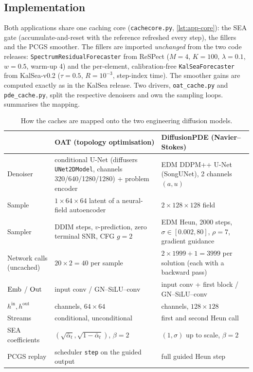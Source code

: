 \subsection{Implementation}\label{sec:app-impl}
Both applications share one caching core (\texttt{cachecore.py}, \cref{lst:app-core}): the SEA gate (accumulate-and-reset with the reference refreshed every step), the fillers and the PCGS smoother. The fillers are imported \emph{unchanged} from the two code releases: \texttt{Spectrum\-Residual\-Forecaster} from ReSPect ($M=4$, $K=100$, $\lambda=0.1$, $w=0.5$, warm-up 4) and the per-element, calibration-free \texttt{KalSea\-Forecaster} from KalSea-v0.2 ($\tau=0.5$, $R=10^{-3}$, step-index time). The smoother gains are computed exactly as in the KalSea release. Two drivers, \texttt{oat\_cache.py} and \texttt{pde\_cache.py}, split the respective denoisers and own the sampling loops.  summarises the mapping.

\begin{table}[t]
  \centering
  \small
  \caption[Mapping of the caches onto the two engineering models]{How the caches are mapped onto the two engineering diffusion models.}
  \label{tab:app-mapping}
  \begin{tabularx}{\textwidth}{@{}l>{\raggedright\arraybackslash}X>{\raggedright\arraybackslash}X@{}}
    \toprule
    & OAT (topology optimisation) & DiffusionPDE (Navier--Stokes) \\
    \midrule
    Denoiser & conditional U-Net (diffusers \texttt{UNet2DModel}, channels 320/640/1280/1280) + problem encoder & EDM DDPM++ U-Net (SongUNet), 2 channels $(a,u)$ \\
    Sample & $1\times64\times64$ latent of a neural-field autoencoder & $2\times128\times128$ field \\
    Sampler & 20 DDIM steps, $v$-prediction, zero terminal SNR, CFG $g=2$ & EDM Heun, 2000 steps, $\sigma\in[0.002,80]$, $\rho=7$, gradient guidance \\
    Network calls (uncached) & $20\times2 = 40$ per sample & $2\times1999+1 = 3999$ per solution (each with a backward pass) \\
    $\mathrm{Emb}$ / $\mathrm{Out}$ & input conv / GN--SiLU--conv & input conv + first block / GN--SiLU--conv \\
    $h^{\mathrm{in}}, h^{\mathrm{out}}$ & 320 channels, $64\times64$ & 256 channels, $128\times128$ \\
    Streams & conditional, unconditional & first and second Heun call \\
    SEA coefficients & $(\sqrt{\bar\alpha_t},\sqrt{1-\bar\alpha_t})$, $\beta=2$ & $(1,\sigma)$ up to scale, $\beta=2$ \\
    PCGS replay & scheduler \texttt{step} on the guided output & full guided Heun step \\
    \bottomrule
  \end{tabularx}
\end{table}

